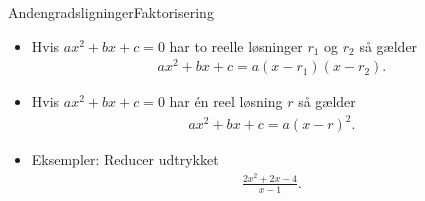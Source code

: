 \begin{frame}{Andengradsligninger}{Faktorisering}
\begin{itemize}
		\setlength\itemsep{1em}
	\item<1-> Hvis $ax^2+bx+c=0$ har to reelle løsninger $r_1$ og $r_2$ så gælder
	\begin{align*}
	ax^2+bx+c=a(x-r_1)(x-r_2).
	\end{align*}
	\item<2-> Hvis $ax^2+bx+c=0$ har én reel løsning $r$ så gælder
	\begin{align*}
	ax^2+bx+c=a(x-r)^2.
	\end{align*}
	\item<3-> Eksempler: Reducer udtrykket
	\begin{align*}
	\frac{2x^2+2x-4}{x-1}.
	\end{align*}
\end{itemize}
\end{frame}
